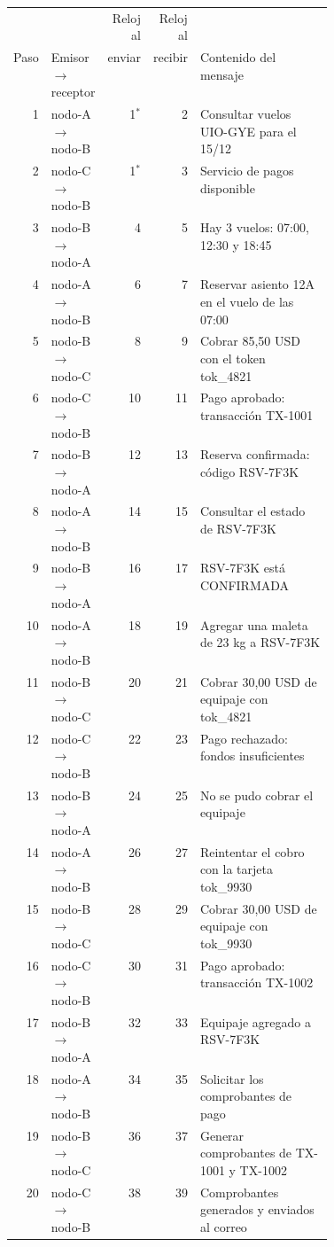 \begin{tabular}{rlrrp{0.42\linewidth}}
\toprule
 & & Reloj al & Reloj al & \\
Paso & Emisor $\rightarrow$ receptor & enviar & recibir & Contenido del mensaje \\
\midrule
1 & nodo-A $\rightarrow$ nodo-B & 1$^{*}$ & 2 & Consultar vuelos UIO-GYE para el 15/12 \\
2 & nodo-C $\rightarrow$ nodo-B & 1$^{*}$ & 3 & Servicio de pagos disponible \\
3 & nodo-B $\rightarrow$ nodo-A & 4 & 5 & Hay 3 vuelos: 07:00, 12:30 y 18:45 \\
4 & nodo-A $\rightarrow$ nodo-B & 6 & 7 & Reservar asiento 12A en el vuelo de las 07:00 \\
5 & nodo-B $\rightarrow$ nodo-C & 8 & 9 & Cobrar 85,50 USD con el token tok\_4821 \\
6 & nodo-C $\rightarrow$ nodo-B & 10 & 11 & Pago aprobado: transacción TX-1001 \\
7 & nodo-B $\rightarrow$ nodo-A & 12 & 13 & Reserva confirmada: código RSV-7F3K \\
8 & nodo-A $\rightarrow$ nodo-B & 14 & 15 & Consultar el estado de RSV-7F3K \\
9 & nodo-B $\rightarrow$ nodo-A & 16 & 17 & RSV-7F3K está CONFIRMADA \\
10 & nodo-A $\rightarrow$ nodo-B & 18 & 19 & Agregar una maleta de 23 kg a RSV-7F3K \\
11 & nodo-B $\rightarrow$ nodo-C & 20 & 21 & Cobrar 30,00 USD de equipaje con tok\_4821 \\
12 & nodo-C $\rightarrow$ nodo-B & 22 & 23 & Pago rechazado: fondos insuficientes \\
13 & nodo-B $\rightarrow$ nodo-A & 24 & 25 & No se pudo cobrar el equipaje \\
14 & nodo-A $\rightarrow$ nodo-B & 26 & 27 & Reintentar el cobro con la tarjeta tok\_9930 \\
15 & nodo-B $\rightarrow$ nodo-C & 28 & 29 & Cobrar 30,00 USD de equipaje con tok\_9930 \\
16 & nodo-C $\rightarrow$ nodo-B & 30 & 31 & Pago aprobado: transacción TX-1002 \\
17 & nodo-B $\rightarrow$ nodo-A & 32 & 33 & Equipaje agregado a RSV-7F3K \\
18 & nodo-A $\rightarrow$ nodo-B & 34 & 35 & Solicitar los comprobantes de pago \\
19 & nodo-B $\rightarrow$ nodo-C & 36 & 37 & Generar comprobantes de TX-1001 y TX-1002 \\
20 & nodo-C $\rightarrow$ nodo-B & 38 & 39 & Comprobantes generados y enviados al correo \\
\bottomrule
\end{tabular}
